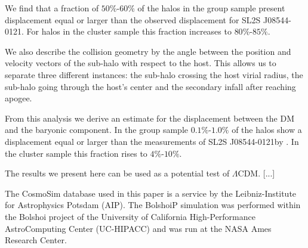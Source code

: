 \documentclass{emulateapj}
\newcommand{\bullg}{SL2S J08544-0121}
\begin{document}
We find that a fraction of $50\%$-$60\%$ of the halos in the group
sample present displacement equal or larger than the observed displacement
for \bullg. For halos in the cluster sample this fraction increases to
$80\%$-$85\%$. 


We also describe the collision geometry by the angle between
the position and velocity vectors of the sub-halo with respect to the
host. This allows us to separate three different instances: the
sub-halo crossing the host virial radius, the sub-halo going
through the host's center and the secondary infall after reaching
apogee.  

From this analysis we derive an estimate for the displacement between
the DM and the baryonic component. In the group sample
$0.1\%$-$1.0\%$ of the halos show a displacement equal or larger than 
the  measurements of \bullg by \citep{Gastaldello}. In the cluster
sample this fraction rises to $4\%$-$10\%$.


The results we present here can be used as a potential test of
$\Lambda$CDM. [...]


The CosmoSim database used in this paper is a service by the
Leibniz-Institute for Astrophysics Potsdam (AIP). The  BolshoiP
simulation was performed within the Bolshoi project of the University
of California High-Performance  AstroComputing Center (UC-HIPACC) and
was run at the NASA Ames Research Center. 



 
\end{document}

